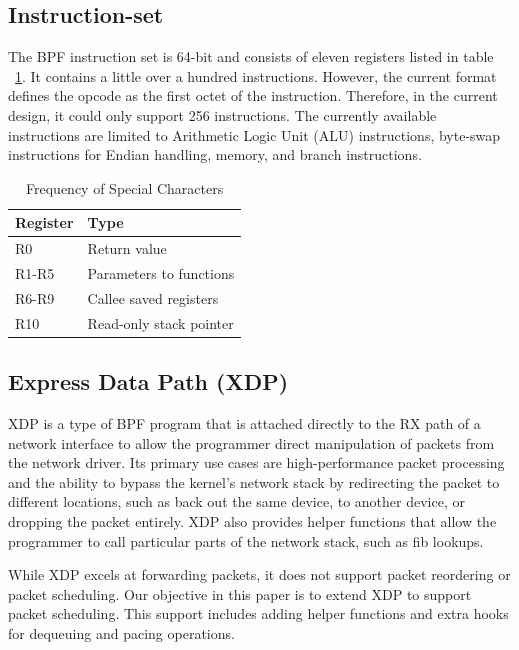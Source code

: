 \documentclass[sigconf, nonacm]{acmart}
\begin{document}
\subsection{Instruction-set}


The BPF instruction set is 64-bit and consists of eleven registers listed in table ~\ref{table:BPF_registers}. It contains a little over a hundred instructions. However, the current format defines the opcode as the first octet of the instruction. Therefore, in the current design, it could only support 256 instructions. The currently available instructions are limited to Arithmetic Logic Unit (ALU) instructions, byte-swap instructions for Endian handling, memory, and branch instructions.

\begin{table}
  \caption{Frequency of Special Characters}
  \label{table:BPF_registers}
  \begin{tabular}{ll}
    \toprule
    Register & Type                    \\
    \midrule
    R0       & Return value            \\
    R1-R5    & Parameters to functions \\
    R6-R9    & Callee saved registers  \\
    R10      & Read-only stack pointer \\
    \bottomrule
\end{tabular}
\end{table}


\subsection{Express Data Path (XDP)}

XDP\cite{hoiland2018express} is a type of BPF program that is attached directly to the RX path of a network interface to allow the programmer direct manipulation of packets from the network driver. Its primary use cases are high-performance packet processing and the ability to bypass the kernel's network stack by redirecting the packet to different locations, such as back out the same device, to another device, or dropping the packet entirely. XDP also provides helper functions that allow the programmer to call particular parts of the network stack, such as fib lookups.

While XDP excels at forwarding packets, it does not support packet reordering or packet scheduling. Our objective in this paper is to extend XDP to support packet scheduling. This support includes adding helper functions and extra hooks for dequeuing and pacing operations.
\end{document}
